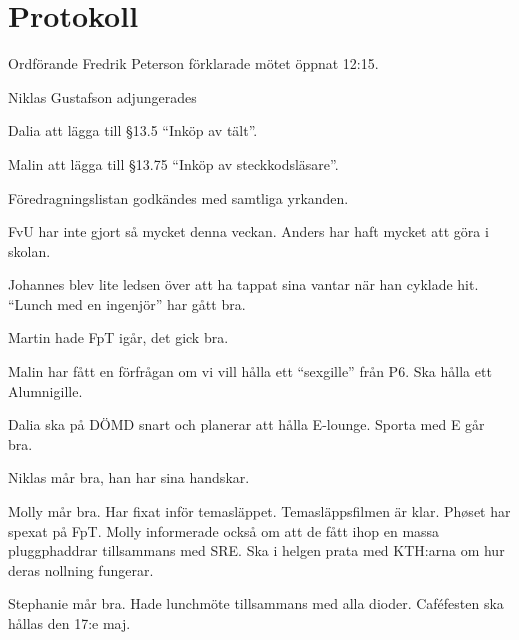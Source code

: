 \documentclass[10pt]{article}
\def\mo{Fredrik Peterson}
\begin{document}
\section*{Protokoll}
\begin{paragrafer}
Ordförande {\mo} förklarade mötet öppnat 12:15.

\valavmo

\valavms

\tosg

Niklas Gustafson adjungerades

\valavj

Dalia \ypa att lägga till \S13.5 ``Inköp av tält''.

Malin \ypa att lägga till \S13.75 ``Inköp av steckkodsläsare''.

Föredragningslistan godkändes med samtliga yrkanden.


\begin{fyllnadsval} %
\end{fyllnadsval}

\begin{paragrafer}
FvU har inte gjort så mycket denna veckan. Anders har haft mycket att göra i skolan.

Johannes blev lite ledsen över att ha tappat sina vantar när han cyklade hit. ``Lunch med en ingenjör'' har gått bra.

Martin hade FpT igår, det gick bra.

Malin har fått en förfrågan om vi vill hålla ett ``sexgille'' från P6. Ska hålla ett Alumnigille.

Dalia ska på DÖMD snart och planerar att hålla E-lounge. Sporta med E går bra.

Niklas mår bra, han har sina handskar.

Molly mår bra. Har fixat inför temasläppet. Temasläppsfilmen är klar. Phøset har spexat på FpT. Molly informerade också om att de fått ihop en massa pluggphaddrar tillsammans med SRE. Ska i helgen prata med KTH:arna om hur deras nollning fungerar.

Stephanie mår bra. Hade lunchmöte tillsammans med alla dioder. Caféfesten ska hållas den 17:e maj.


\end{paragrafer}
\end{paragrafer}
\end{document}
